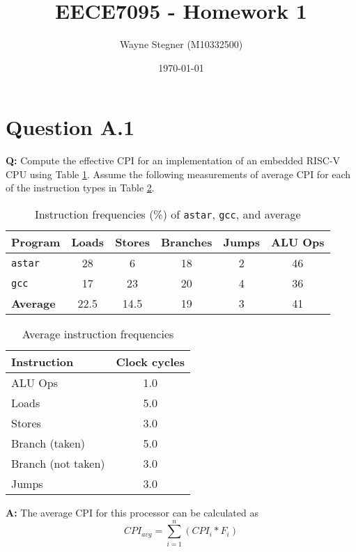 \documentclass[a4paper]{article}
\title{EECE7095 - Homework 1}
\author{Wayne Stegner (M10332500)}
\date{\today}
\newcommand{\tabRef}[1]{Table \ref{#1}}
\begin{document}
  \maketitle
  \section*{Question A.1}
  \par \textbf{Q:}
  Compute the effective CPI for an implementation of an embedded RISC-V CPU
  using \tabRef{tab:instrMix}.
  Assume the following measurements of average CPI for each of the instruction
  types in \tabRef{tab:instrCpi}.
  \begin{table}[h]
    \centering
    \caption{Instruction frequencies (\%) of \texttt{astar}, \texttt{gcc}, and
      average}
    \begin{tabular}{l c c c c c}
      \hline
      \textbf{Program} & \textbf{Loads} & \textbf{Stores} & \textbf{Branches} &
      \textbf{Jumps} & \textbf{ALU Ops} \\
      \hline \hline
      \texttt{astar} & 28 & 6 & 18 & 2 & 46 \\
      \hline
      \texttt{gcc} & 17 & 23 & 20 & 4 & 36 \\
      \hline
      \textbf{Average} & 22.5 & 14.5 & 19 & 3 & 41 \\
      \hline
    \end{tabular}
    \label{tab:instrMix}
  \end{table}
  \begin{table}[h]
    \centering
    \caption{Average instruction frequencies}
    \begin{tabular}{l c}
      \hline
      \textbf{Instruction} & \textbf{Clock cycles} \\
      \hline \hline
      ALU Ops & 1.0 \\
      \hline
      Loads & 5.0 \\
      \hline
      Stores & 3.0 \\
      \hline
      Branch (taken) & 5.0 \\
      \hline
      Branch (not taken) & 3.0 \\
      \hline
      Jumps & 3.0 \\
      \hline
    \end{tabular}
    \label{tab:instrCpi}
  \end{table}
  \par \textbf{A:}
  The average CPI for this processor can be calculated as
  \begin{equation}
    CPI_{avg} = \sum_{i=1}^{n}(CPI_i * F_i)
    \label{eq:avgCpi}
  \end{equation}
\end{document}

